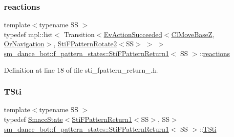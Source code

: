 \subsubsection{\texorpdfstring{reactions}{reactions}}
{\footnotesize\ttfamily template$<$typename SS $>$ \\
typedef mpl\+::list$<$ Transition$<$\hyperlink{structsmacc_1_1default__events_1_1EvActionSucceeded}{Ev\+Action\+Succeeded}$<$\hyperlink{classcl__move__base__z_1_1ClMoveBaseZ}{Cl\+Move\+BaseZ}, \hyperlink{classsm__dance__bot_1_1OrNavigation}{Or\+Navigation}$>$, \hyperlink{classsm__dance__bot_1_1f__pattern__states_1_1StiFPatternRotate2}{Sti\+F\+Pattern\+Rotate2}$<$SS$>$ $>$ $>$ \hyperlink{classsm__dance__bot_1_1f__pattern__states_1_1StiFPatternReturn1}{sm\+\_\+dance\+\_\+bot\+::f\+\_\+pattern\+\_\+states\+::\+Sti\+F\+Pattern\+Return1}$<$ SS $>$\+::\hyperlink{classsm__dance__bot_1_1f__pattern__states_1_1StiFPatternReturn1_a2fcaf186ce44b90735584e304831f944}{reactions}}



Definition at line 18 of file sti\+\_\+fpattern\+\_\+return\+\_.\+h.

\mbox{\label{classsm__dance__bot_1_1f__pattern__states_1_1StiFPatternReturn1_afd0d5d7e8dc6ad87f7314176d86d919e}} 
\subsubsection{\texorpdfstring{T\+Sti}{TSti}}
{\footnotesize\ttfamily template$<$typename SS $>$ \\
typedef \hyperlink{classSmaccState}{Smacc\+State}$<$\hyperlink{classsm__dance__bot_1_1f__pattern__states_1_1StiFPatternReturn1}{Sti\+F\+Pattern\+Return1}$<$SS$>$, SS$>$ \hyperlink{classsm__dance__bot_1_1f__pattern__states_1_1StiFPatternReturn1}{sm\+\_\+dance\+\_\+bot\+::f\+\_\+pattern\+\_\+states\+::\+Sti\+F\+Pattern\+Return1}$<$ SS $>$\+::\hyperlink{classsm__dance__bot_1_1f__pattern__states_1_1StiFPatternReturn1_afd0d5d7e8dc6ad87f7314176d86d919e}{T\+Sti}}



